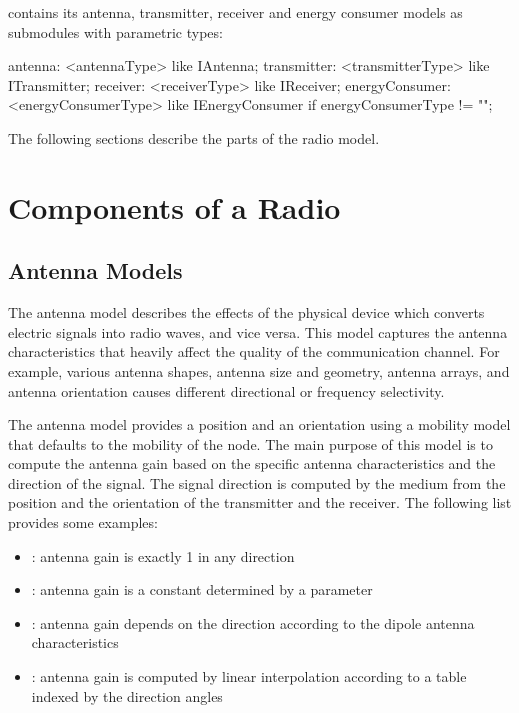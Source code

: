  contains its antenna, transmitter, receiver and energy
consumer models as submodules with parametric types:

\begin{ned}
antenna: <antennaType> like IAntenna;
transmitter: <transmitterType> like ITransmitter;
receiver: <receiverType> like IReceiver;
energyConsumer: <energyConsumerType> like IEnergyConsumer
    if energyConsumerType != "";
\end{ned}

The following sections describe the parts of the radio model.

\section{Components of a Radio}
\label{sec:phy:components-of-a-radio}

\subsection{Antenna Models}
\label{sec:phy:antenna-models}

The antenna model describes the effects of the physical device which converts
electric signals into radio waves, and vice versa. This model captures the
antenna characteristics that heavily affect the quality of the communication
channel. For example, various antenna shapes, antenna size and geometry, antenna
arrays, and antenna orientation causes different directional or frequency
selectivity.

The antenna model provides a position and an orientation using a mobility model
that defaults to the mobility of the node. The main purpose of this model is to
compute the antenna gain based on the specific antenna characteristics and the
direction of the signal. The signal direction is computed by the medium from the
position and the orientation of the transmitter and the receiver. The following
list provides some examples:

\begin{itemize}
  \item {}: antenna gain is exactly 1 in any direction
  \item {}: antenna gain is a constant determined by
    a parameter
  \item {}: antenna gain depends on the direction according
    to the dipole antenna characteristics
  \item {}: antenna gain is computed by linear
    interpolation according to a table indexed by the direction angles
\end{itemize}

